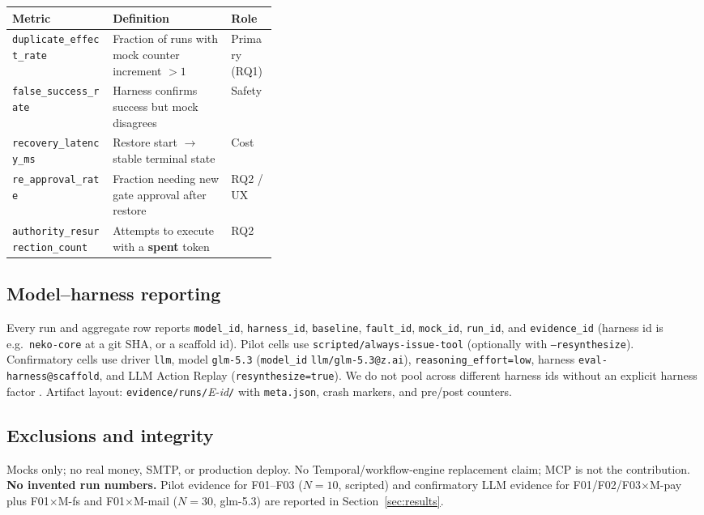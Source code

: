 \documentclass[11pt,a4paper]{article}
\begin{document}
\begin{center}
\small
\begin{tabularx}{\linewidth}{@{}>{\raggedright\arraybackslash}p{0.38\linewidth}>{\raggedright\arraybackslash}Xl@{}}
\toprule
Metric & Definition & Role \\
\midrule
\texttt{duplicate\_effect\_rate} &
  Fraction of runs with mock counter increment ${>}1$ &
  Primary (RQ1) \\
\texttt{false\_success\_rate} &
  Harness confirms success but mock disagrees &
  Safety \\
\texttt{recovery\_latency\_ms} &
  Restore start $\to$ stable terminal state &
  Cost \\
\texttt{re\_approval\_rate} &
  Fraction needing new gate approval after restore &
  RQ2 / UX \\
\texttt{authority\_resurrection\_count} &
  Attempts to execute with a \textbf{spent} token &
  RQ2 \\
\bottomrule
\end{tabularx}
\end{center}

\subsection{Model--harness reporting}

Every run and aggregate row reports
\texttt{model\_id}, \texttt{harness\_id}, \texttt{baseline},
\texttt{fault\_id}, \texttt{mock\_id}, \texttt{run\_id}, and
\texttt{evidence\_id} (harness id is e.g.\ \texttt{neko-core} at a git
SHA, or a scaffold id). Pilot cells use
\texttt{scripted/always-issue-tool} (optionally with
\texttt{--resynthesize}). Confirmatory cells use driver
\texttt{llm}, model \texttt{glm-5.3} (\texttt{model\_id}
\texttt{llm/glm-5.3@z.ai}), \texttt{reasoning\_effort=low}, harness
\texttt{eval-harness@scaffold}, and LLM Action Replay
(\texttt{resynthesize=true}). We do not pool across different harness
ids without an explicit harness factor \cite{harnessbench2026}. Artifact
layout: \texttt{evidence/runs/}\textit{E-id}\texttt{/} with
\texttt{meta.json}, crash markers, and pre/post counters.

\subsection{Exclusions and integrity}

Mocks only; no real money, SMTP, or production deploy. No
Temporal/workflow-engine replacement claim; MCP is not the contribution.
\textbf{No invented run numbers.} Pilot evidence for F01--F03 ($N{=}10$,
scripted) and confirmatory LLM evidence for F01/F02/F03$\times$M-pay
plus F01$\times$M-fs and F01$\times$M-mail ($N{=}30$, glm-5.3) are reported in
Section~\ref{sec:results}.
\end{document}
